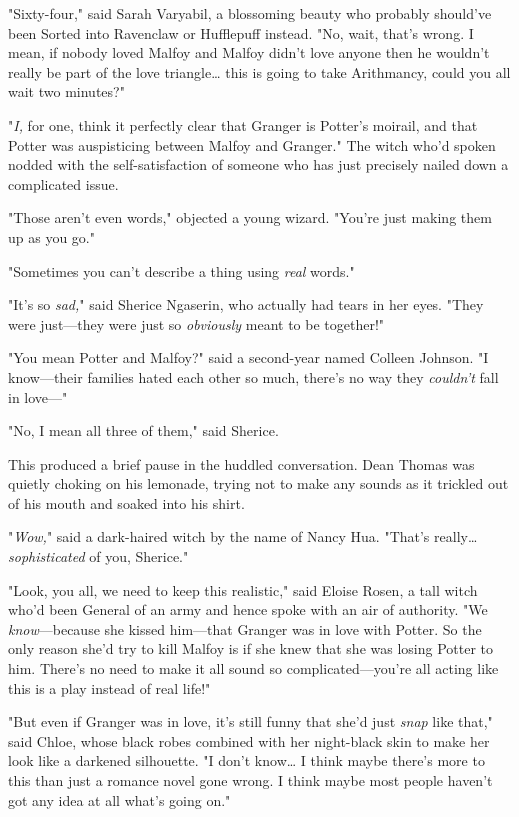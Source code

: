 "Sixty-four," said Sarah Varyabil, a blossoming beauty who probably should've 
been Sorted into Ravenclaw or Hufflepuff instead. "No, wait, that's wrong. I 
mean, if nobody loved Malfoy and Malfoy didn't love anyone then he wouldn't 
really be part of the love triangle{\ldots} this is going to take Arithmancy, 
could you all wait two minutes?"

"\emph{I,} for one, think it perfectly clear that Granger is Potter's moirail, 
and that Potter was auspisticing between Malfoy and Granger." The witch who'd 
spoken nodded with the self-satisfaction of someone who has just precisely 
nailed down a complicated issue.

"Those aren't even words," objected a young wizard. "You're just making them up 
as you go."

"Sometimes you can't describe a thing using \emph{real} words."

"It's so \emph{sad,}" said Sherice Ngaserin, who actually had tears in her 
eyes. "They were just---they were just so \emph{obviously} meant to be 
together!"

"You mean Potter and Malfoy?" said a second-year named Colleen Johnson. "I 
know---their families hated each other so much, there's no way they 
\emph{couldn't} fall in love---"

"No, I mean all three of them," said Sherice.

This produced a brief pause in the huddled conversation. Dean Thomas was 
quietly choking on his lemonade, trying not to make any sounds as it trickled 
out of his mouth and soaked into his shirt.

"\emph{Wow,}" said a dark-haired witch by the name of Nancy Hua. "That's 
really{\ldots} \emph{sophisticated} of you, Sherice."

"Look, you all, we need to keep this realistic," said Eloise Rosen, a tall 
witch who'd been General of an army and hence spoke with an air of authority. 
"We \emph{know}---because she kissed him---that Granger was in love with 
Potter. So the only reason she'd try to kill Malfoy is if she knew that she was 
losing Potter to him. There's no need to make it all sound so 
complicated---you're all acting like this is a play instead of real life!"

"But even if Granger was in love, it's still funny that she'd just \emph{snap} 
like that," said Chloe, whose black robes combined with her night-black skin to 
make her look like a darkened silhouette. "I don't know{\ldots} I think maybe 
there's more to this than just a romance novel gone wrong. I think maybe most 
people haven't got any idea at all what's going on."

